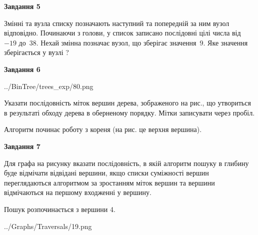 \documentclass[12pt, ukrainian]{article}
\begin{document}
{\begin {large}
{\begin {center}\textbf{Завдання 5}\end {center}}\par
Змінні  та  вузла списку позначають наступний та попередній за ним вузол відповідно. Починаючи з голови, у список записано послідовні цілі числа від~$-19$ до~$38$. Нехай змінна  позначає вузол, що зберігає значення~$9$.
Яке значення зберігається у вузлі  ?\par
\newpage

{\begin {center}\textbf{Завдання 6}\end {center}}\par

\begin{center}
	{../BinTree/trees_exp/80.png}
\end{center}
Указати послідовність міток вершин дерева, зображеного на рис., що утвориться в результаті обходу дерева в оберненому порядку. Мітки записувати через пробіл.\par Алгоритм починає роботу з кореня (на рис. це верхня вершина).\par
\newpage

{\begin {center}\textbf{Завдання 7}\end {center}}\par
Для графа на рисунку вказати послідовність, в якій алгоритм пошуку в глибину буде відмічати відвідані вершини, якщо списки суміжності вершин переглядаються алгоритмом за зростанням міток вершин та вершини відмічаються на першому вход\-женні у вершину.\par
Пошук розпочинається з вершини 4.\par

\begin{center}
	{../Graphs/Traversals/19.png}
\end{center}\par
\newpage


\end{large}}
\end{document}
